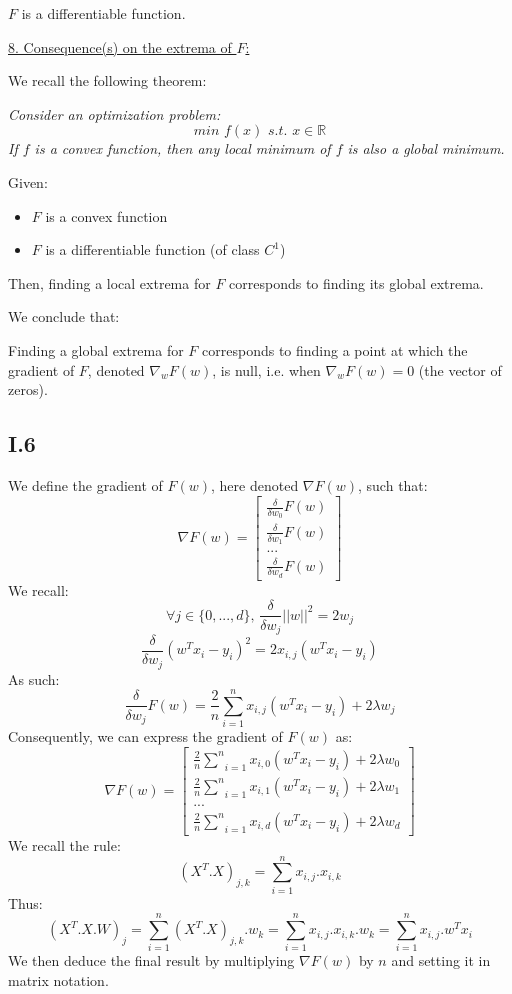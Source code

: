 \documentclass{homework}
\begin{document}
\textcolor{OliveGreen}{$F$ is a differentiable function.}

\underline{8. Consequence(s) on the extrema of $F$:}

We recall the following theorem:

\textit{Consider an optimization problem:
$$min\,\,f(x)\,\,{s.t.}\,\,x\in\mathbb{R}$$
If $f$ is a convex function, then any local minimum of $f$ is also a global minimum.}

Given:
\begin{itemize}
    \item $F$ is a convex function
    \item $F$ is a differentiable function (of class $C^1$)
\end{itemize}
Then, finding a local extrema for $F$ corresponds to finding its global extrema.

We conclude that: 

\textcolor{OliveGreen}{Finding a global extrema for $F$ corresponds to finding a point at which the gradient of $F$, 
denoted $\nabla_wF(w)$, is null, i.e. when $\nabla_wF(w)=0$ (the vector of zeros).}

\subsection*{I.6}

We define the gradient of $F(w)$, here denoted $\nabla F(w)$, such that:
$$\nabla F(w)=\begin{bmatrix}
\frac{\delta}{\delta w_0}F(w) \\
\frac{\delta}{\delta w_1}F(w) \\
...  \\
\frac{\delta}{\delta w_d}F(w)
\end{bmatrix}$$
We recall:
$$\forall j\in\{0,...,d\},\,\frac{\delta}{\delta w_j}||w||^2=2w_j$$
$$\frac{\delta}{\delta w_j}(w^Tx_i-y_i)^2=2x_{i,j}(w^Tx_i-y_i)$$
As such:
$$\frac{\delta}{\delta w_j}F(w)=\frac{2}{n}\underset{i=1}{\overset{n}{\sum}}x_{i,j}(w^Tx_i - y_i)+2\lambda w_j$$
Consequently, we can express the gradient of $F(w)$ as:
$$\nabla F(w)=\begin{bmatrix}
\frac{2}{n}\underset{i=1}{\overset{n}{\sum}}x_{i,0}(w^Tx_i - y_i)+2\lambda w_0 \\
\frac{2}{n}\underset{i=1}{\overset{n}{\sum}}x_{i,1}(w^Tx_i - y_i)+2\lambda w_1 \\
...  \\
\frac{2}{n}\underset{i=1}{\overset{n}{\sum}}x_{i,d}(w^Tx_i - y_i)+2\lambda w_d
\end{bmatrix}$$
We recall the rule:
$$(X^T.X)_{j,k}=\underset{i=1}{\overset{n}{\sum}}x_{i,j}.x_{i,k}$$
Thus:
$$(X^T.X.W)_{j}=\underset{i=1}{\overset{n}{\sum}}(X^T.X)_{j,k}.w_k=\underset{i=1}{\overset{n}{\sum}}x_{i,j}.x_{i,k}.w_k=\underset{i=1}{\overset{n}{\sum}}x_{i,j}.w^Tx_i$$
We then deduce the final result by multiplying $\nabla F(w)$ by $n$ and setting it in matrix notation. 
\end{document}
